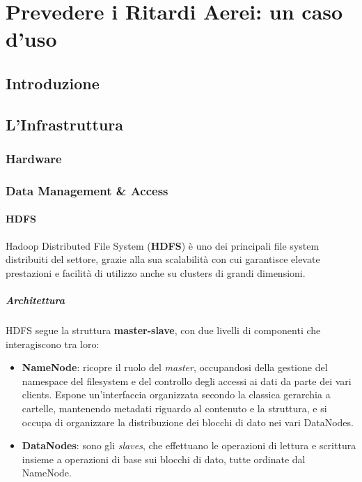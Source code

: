 \chapter{Prevedere i Ritardi Aerei: un caso d'uso}

\section{Introduzione}

\pagebreak

\section{L'Infrastruttura}

\subsection{Hardware}

\pagebreak

\subsection{Data Management \& Access}
\subsubsection{HDFS}
Hadoop Distributed File System (\textbf{HDFS}) \cite{hadoop_doc} è uno dei principali file system distribuiti del settore, grazie alla sua scalabilità con cui garantisce elevate prestazioni e facilità di utilizzo anche su clusters di grandi dimensioni.

\paragraph{Architettura}
HDFS segue la struttura \textbf{master-slave}, con due livelli di componenti che interagiscono tra loro:
\begin{itemize}
	\item \textbf{NameNode}: ricopre il ruolo del \textit{master}, occupandosi della gestione del namespace del filesystem e del controllo degli accessi ai dati da parte dei vari clients. Espone un'interfaccia organizzata secondo la classica gerarchia a cartelle, mantenendo metadati riguardo al contenuto e la struttura, e si occupa di organizzare la distribuzione dei blocchi di dato nei vari DataNodes.
	
	\item \textbf{DataNodes}: sono gli \textit{slaves}, che effettuano le operazioni di lettura e scrittura insieme a operazioni di base sui blocchi di dato, tutte ordinate dal NameNode. 
\end{itemize}

